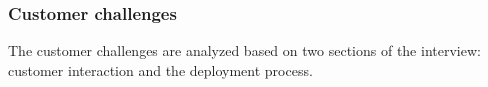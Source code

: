 \documentclass[english, grading]{tktltiki2}
\theoremstyle{definition}
\theoremstyle{remark}
\begin{document}





\subsubsection{Customer challenges}
The customer challenges are analyzed based on two sections of the interview: customer interaction and the deployment process.
\end{document}
